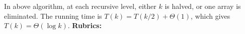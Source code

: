 \documentclass[11pt]{article}
\begin{document}
\begin{qunlist}

In above algorithm, at each recursive level, either $k$ is halved, or one array is
eliminated.  The running time is $T(k)=T(k/2)+\Theta(1)$, which gives $T(k)=\Theta(\log k)$. 
\newpage
{\huge {\bf Rubrics:}}


\end{qunlist}
\end{document}
